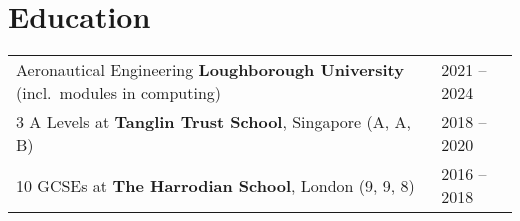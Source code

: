 \documentclass[a4paper,12pt]{article}
\begin{document}

\section{Education}
\begin{tabularx}{\linewidth}{@{}l X@{}}
    Aeronautical Engineering \textbf{Loughborough University} (incl.\ modules in computing) & \hfill 2021 -- 2024 \\
    3 A Levels at \textbf{Tanglin Trust School}, Singapore (A, A, B)                        & \hfill 2018 -- 2020 \\
    10 GCSEs at \textbf{The Harrodian School}, London (9, 9, 8)                             & \hfill 2016 -- 2018 \\
\end{tabularx}

\end{document}

